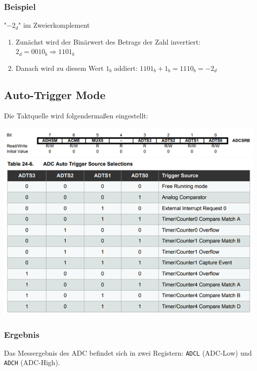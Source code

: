 \subsubsection*{Beispiel}
"$-2_d$" im Zweierkomplement \\
\begin{enumerate}
    \item Zunächst wird der Binärwert des Betrags der Zahl invertiert: $2_d=0010_b\Rightarrow 1101_b$ \\
    \item Danach wird zu diesem Wert $1_b$ addiert: $1101_b + 1_b = 1110_b = -2_d$
\end{enumerate}

\newpage

\subsection{Auto-Trigger Mode} \label{Atmega/AutoTrigger}
Die Taktquelle wird folgendermaßen eingestellt:

\includegraphics{Atmega/AutoTrigger-Reg.png}
\vspace{0.5cm}
\includegraphics{Atmega/ADC-AutoTrigger-Select.png}

\subsubsection*{Ergebnis}
Das Messergebnis des ADC befindet sich in zwei Registern: \verb|ADCL| (ADC-Low) und \verb|ADCH| (ADC-High).

